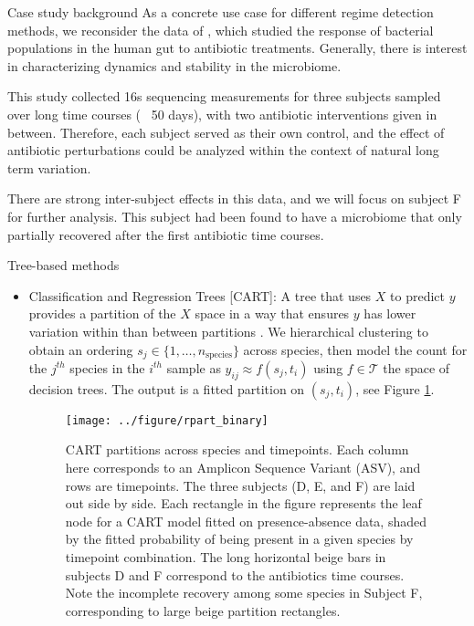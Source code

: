 \documentclass[final, 8pt]{beamer}
\newlength{\onecolwid}
\begin{document}
\begin{frame}
\begin{columns}
\begin{column}{\onecolwid}
\begin{block}{Case study background}
As a concrete use case for different regime detection methods, we reconsider the
data of \citep{dethlefsen2011incomplete}, which studied the response of
bacterial populations in the human gut to antibiotic treatments. Generally,
there is interest in characterizing dynamics and stability in the microbiome.

This study collected 16s sequencing measurements for three subjects sampled over
long time courses (~ 50 days), with two antibiotic interventions given in
between. Therefore, each subject served as their own control, and the effect of
antibiotic perturbations could be analyzed within the context of natural long
term variation.

There are strong inter-subject effects in this data, and we will focus on
subject F for further analysis. This subject had been found to have a microbiome
that only partially recovered after the first antibiotic time courses.
\end{block}

\begin{block}{Tree-based methods}
\begin{itemize}
\item Classification and Regression Trees [CART]: A tree that uses $X$ to
  predict $y$ provides a partition of the $X$ space in a way that ensures $y$
  has lower variation within than between partitions
  \citep{breiman1984classification}. We hierarchical clustering to obtain an
  ordering $s_{j} \in \{1, \dots, n_{\text{species}}\}$ across species, then
  model the count for the $j^{th}$ species in the $i^{th}$ sample as $y_{ij}
  \approx f\left(s_{j}, t_{i}\right)$ using $f \in \mathcal{T}$ the space of
  decision trees. The output is a fitted partition on $\left(s_{j},
  t_{i}\right)$, see Figure \ref{fig:rpart_binary}.

\begin{figure}[ht]
  \centering
  \texttt{[image: ../figure/rpart\_binary]}
  \caption{CART partitions across species and timepoints. Each column here
    corresponds to an Amplicon Sequence Variant (ASV), and rows are timepoints.
    The three subjects (D, E, and F) are laid out side by side. Each rectangle
    in the figure represents the leaf node for a CART model fitted on
    presence-absence data, shaded by the fitted probability of being present in
    a given species by timepoint combination. The long horizontal beige bars in
    subjects D and F correspond to the antibiotics time courses. Note the
    incomplete recovery among some species in Subject F, corresponding to large
    beige partition rectangles.
    \label{fig:rpart_binary}}
\end{figure}
\end{itemize}
\end{block}
\end{column}


\end{columns}
\end{frame}
\end{document}

